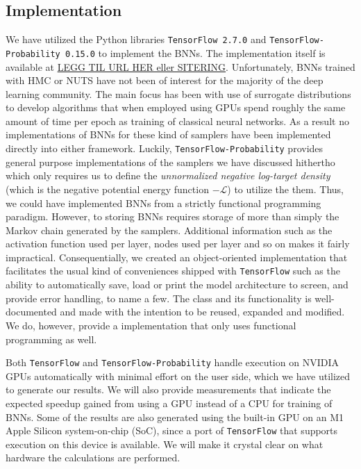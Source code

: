 \subsection{Implementation}
We have utilized the Python libraries {\tt TensorFlow 2.7.0} and {\tt TensorFlow-Probability 0.15.0} to implement the BNNs. 
The implementation itself is available at \url{LEGG TIL URL HER eller SITERING}. Unfortunately, BNNs trained with HMC or NUTS have not been of interest for the majority of the deep learning community. The main focus has been with use of surrogate distributions to develop algorithms that when employed using GPUs spend roughly the same amount of time per epoch as training of classical neural networks. As a result no implementations of BNNs for these kind of samplers have been implemented directly into either framework. Luckily, {\tt TensorFlow-Probability} provides general purpose implementations of the samplers we have discussed hithertho 
which only requires us to define the \textit{unnormalized negative log-target density} (which is the negative potential energy function $-\mathcal{L}$) to utilize the them. Thus, we could have implemented BNNs from a strictly functional programming paradigm. However, to storing BNNs requires storage of more than simply the Markov chain generated by the samplers. Additional information such as the activation function used per layer, nodes used per layer and so on makes it fairly impractical. Consequentially, we created an object-oriented implementation that facilitates the usual kind of conveniences shipped with {\tt TensorFlow} such as the ability to automatically save, load or print the model architecture to screen, and provide error handling, to name a few. The class and its functionality is well-documented and made with the intention to be reused, expanded and modified. We do, however, provide a implementation that only uses functional programming as well.

Both {\tt TensorFlow} and {\tt TensorFlow-Probability} handle execution on NVIDIA GPUs automatically with minimal effort on the user side, which we have utilized to generate our results. We will also provide measurements that indicate the expected speedup gained from using a GPU instead of a CPU for training of BNNs. Some of the results are also generated using the built-in GPU on an M1 Apple Silicon system-on-chip (SoC), since a port of {\tt TensorFlow} that supports execution on this device is available. We will make it crystal clear on what hardware the calculations are performed.


